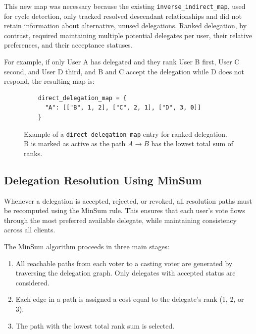 This new map was necessary because the existing \texttt{inverse\_indirect\_map}, used for cycle detection, only tracked resolved descendant relationships and did not retain information about alternative, unused delegations. Ranked delegation, by contrast, required maintaining multiple potential delegates per user, their relative preferences, and their acceptance statuses.


For example, if only User A has delegated and they rank User B first, User C second, and User D third, and B and C accept the delegation while D does not respond, the resulting map is:

\begin{figure}[H]
  \begin{verbatim}
    direct_delegation_map = {
      "A": [["B", 1, 2], ["C", 2, 1], ["D", 3, 0]]
    }
  \end{verbatim}
  \caption{Example of a \texttt{direct\_delegation\_map} entry for ranked delegation. B is marked as active as the path $A\to B$ has the lowest total sum of ranks.}
\end{figure}

\subsection{Delegation Resolution Using MinSum}

Whenever a delegation is accepted, rejected, or revoked, all resolution paths must be recomputed using the MinSum rule. This ensures that each user's vote flows through the most preferred available delegate, while maintaining consistency across all clients.

The MinSum algorithm proceeds in three main stages:

\begin{enumerate}
    \item All reachable paths from each voter to a casting voter are generated by traversing the delegation graph. Only delegates with accepted status are considered.
    \item Each edge in a path is assigned a cost equal to the delegate's rank (1, 2, or 3).
    \item The path with the lowest total rank sum is selected.
\end{enumerate}

